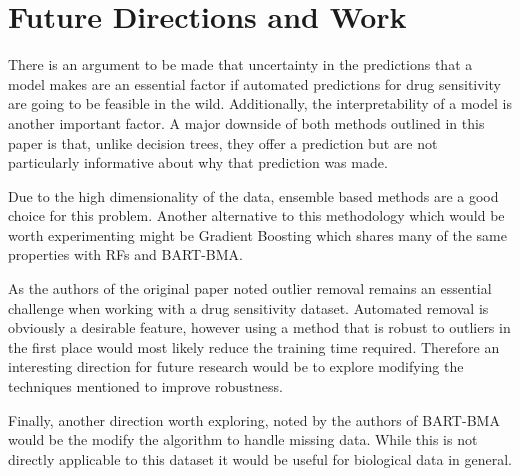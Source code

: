 \documentclass[journal]{IEEEtran}
\begin{document}
\section{Future Directions and Work}
There is an argument to be made that uncertainty in the predictions that a model makes are an essential factor if automated predictions for drug sensitivity are going to be feasible in the wild. Additionally, the interpretability of a model is another important factor. A major downside of both methods outlined in this paper is that, unlike decision trees, they offer a prediction but are not particularly informative about why that prediction was made.

Due to the high dimensionality of the data, ensemble based methods are a good choice for this problem. Another alternative to this methodology which would be worth experimenting might be Gradient Boosting \cite{friedman2001greedy} which shares many of the same properties with RFs and BART-BMA.

As the authors of the original paper noted outlier removal remains an essential challenge when working with a drug sensitivity dataset. Automated removal is obviously a desirable feature, however using a method that is robust to outliers in the first place would most likely reduce the training time required. Therefore an interesting direction for future research would be to explore modifying the techniques mentioned to improve robustness.

Finally, another direction worth exploring, noted by the authors of BART-BMA would be the modify the algorithm to handle missing data. While this is not directly applicable to this dataset it would be useful for biological data in general.


%
%
\end{document}
